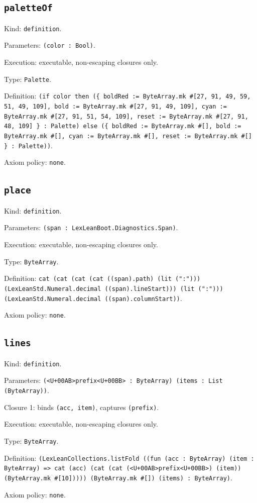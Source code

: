 \documentclass[11pt]{article}
\begin{document}
\subsection*{\texttt{paletteOf}}
\noindent Kind: \texttt{definition}.\par
\noindent Parameters: \texttt{(color : Bool)}.\par
\noindent Execution: executable, non-escaping closures only.\par
\noindent Type: \texttt{Palette}.\par
\noindent Definition: \texttt{(if color then (\{ boldRed := ByteArray.mk \#[27, 91, 49, 59, 51, 49, 109], bold := ByteArray.mk \#[27, 91, 49, 109], cyan := ByteArray.mk \#[27, 91, 51, 54, 109], reset := ByteArray.mk \#[27, 91, 48, 109] \} : Palette) else (\{ boldRed := ByteArray.mk \#[], bold := ByteArray.mk \#[], cyan := ByteArray.mk \#[], reset := ByteArray.mk \#[] \} : Palette))}.\par
\noindent Axiom policy: \texttt{none}.\par
\subsection*{\texttt{place}}
\noindent Kind: \texttt{definition}.\par
\noindent Parameters: \texttt{(span : LexLeanBoot.Diagnostics.Span)}.\par
\noindent Execution: executable, non-escaping closures only.\par
\noindent Type: \texttt{ByteArray}.\par
\noindent Definition: \texttt{cat (cat (cat (cat ((span).path) (lit (":"))) (LexLeanStd.Numeral.decimal ((span).lineStart))) (lit (":"))) (LexLeanStd.Numeral.decimal ((span).columnStart))}.\par
\noindent Axiom policy: \texttt{none}.\par
\subsection*{\texttt{lines}}
\noindent Kind: \texttt{definition}.\par
\noindent Parameters: \texttt{(<U+00AB>prefix<U+00BB> : ByteArray) (items : List (ByteArray))}.\par
\noindent Closure 1: binds \texttt{(acc, item)}, captures \texttt{(prefix)}.\par
\noindent Execution: executable, non-escaping closures only.\par
\noindent Type: \texttt{ByteArray}.\par
\noindent Definition: \texttt{(LexLeanCollections.listFold ((fun (acc : ByteArray) (item : ByteArray) => cat (acc) (cat (cat (<U+00AB>prefix<U+00BB>) (item)) (ByteArray.mk \#[10])))) (ByteArray.mk \#[]) (items) : ByteArray)}.\par
\noindent Axiom policy: \texttt{none}.\par
\end{document}
